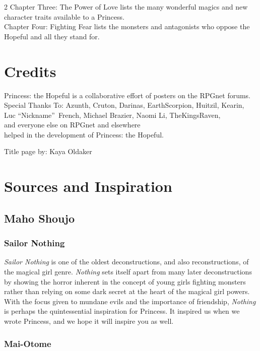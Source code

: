 \begin{multicols}{2}
\noindent Chapter Three: The Power of Love lists the many wonderful magics and new character traits available to a Princess. \\

\noindent Chapter Four: Fighting Fear lists the monsters and antagonists who oppose the Hopeful and all they stand for.

\section*{Credits}

Princess: the Hopeful is a collaborative effort of posters on the RPGnet forums. \\
Special Thanks To: Azunth, Cruton, Darinas, EarthScorpion, Huitzil, Kearin,\\ Luc \textquotedblleft Nickname\textquotedblright\, French, Michael Brazier, Naomi Li, TheKingsRaven,\\ and everyone else on RPGnet and elsewhere \\ helped in the development of Princess: the Hopeful. 

Title page by: Kaya Oldaker

\section*{Sources and Inspiration}

\subsection*{Maho Shoujo}

\subsubsection*{Sailor Nothing}

\textit{Sailor Nothing} is one of the oldest deconstructions, and also reconstructions, of the magical girl genre. \textit{Nothing} sets itself apart from many later deconstructions by showing the horror inherent in the concept of young girls fighting monsters rather than relying on some dark secret at the heart of the magical girl powers. With the focus given to mundane evils and the importance of friendship, \textit{Nothing} is perhaps the quintessential inspiration for Princess. It inspired us when we wrote Princess, and we hope it will inspire you as well. 

\subsubsection*{Mai-Otome}


\end{multicols}
